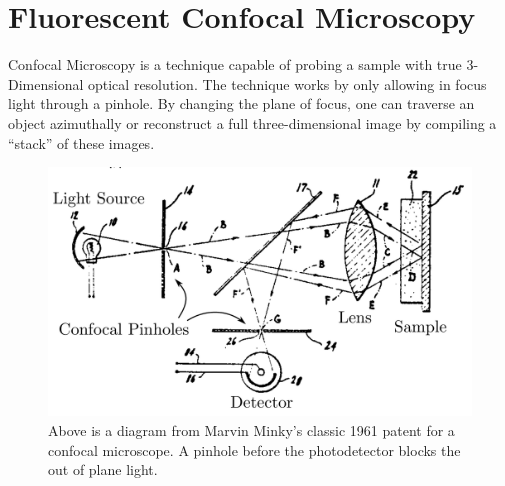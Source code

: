 
\section{Fluorescent Confocal Microscopy} \label{ch:microscopy}
Confocal Microscopy is a technique capable of probing a sample with true 3-Dimensional optical resolution. The technique works by only allowing in focus light through a pinhole. By changing the plane of focus, one can traverse an object azimuthally or reconstruct a full three-dimensional image by compiling a ``stack'' of these images.  

\begin{figure}[h!]
	\centering
	\includegraphics[width=\linewidth]{confocal_stuff/confocalpatent_crop2}
	\caption[Minsky Patent Diagram]{Above is a diagram from Marvin Minky's classic 1961 patent \cite{patent:3013467} for a confocal microscope. A pinhole before the photodetector blocks the out of plane light.}
	\label{fig:confocalpatent}
\end{figure}


